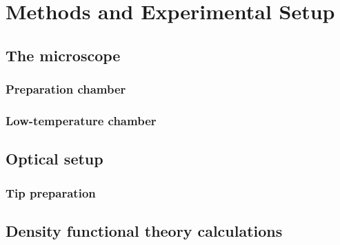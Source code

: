 
\chapter{Methods and Experimental Setup}
\label{ch:expsetup}


\section{The microscope}

\subsection{Preparation chamber}

\subsection{Low-temperature chamber}


\section{Optical setup}

\subsection{Tip preparation}



\section{Density functional theory calculations}

